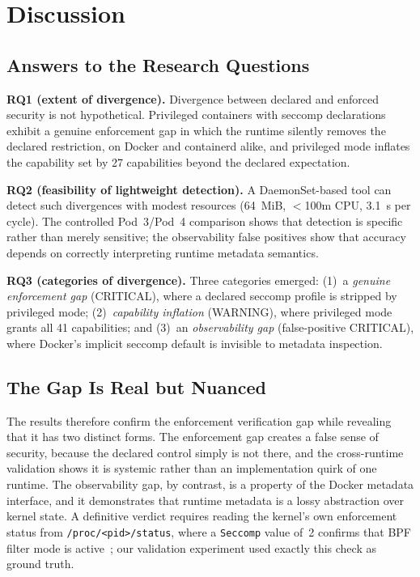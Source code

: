 \documentclass[sigconf]{acmart}
\begin{document}
\section{Discussion}

\subsection{Answers to the Research Questions}

\textbf{RQ1 (extent of divergence).} Divergence between declared and enforced security is not hypothetical. Privileged containers with seccomp declarations exhibit a genuine enforcement gap in which the runtime silently removes the declared restriction, on Docker and containerd alike, and privileged mode inflates the capability set by 27 capabilities beyond the declared expectation.

\textbf{RQ2 (feasibility of lightweight detection).} A DaemonSet-based tool can detect such divergences with modest resources (64~MiB, $<$100m CPU, 3.1~s per cycle). The controlled Pod~3/Pod~4 comparison shows that detection is specific rather than merely sensitive; the observability false positives show that accuracy depends on correctly interpreting runtime metadata semantics.

\textbf{RQ3 (categories of divergence).} Three categories emerged: (1)~a \emph{genuine enforcement gap} (CRITICAL), where a declared seccomp profile is stripped by privileged mode; (2)~\emph{capability inflation} (WARNING), where privileged mode grants all 41 capabilities; and (3)~an \emph{observability gap} (false-positive CRITICAL), where Docker's implicit seccomp default is invisible to metadata inspection.

\subsection{The Gap Is Real but Nuanced}

The results therefore confirm the enforcement verification gap while revealing that it has two distinct forms. The enforcement gap creates a false sense of security, because the declared control simply is not there, and the cross-runtime validation shows it is systemic rather than an implementation quirk of one runtime. The observability gap, by contrast, is a property of the Docker metadata interface, and it demonstrates that runtime metadata is a lossy abstraction over kernel state. A definitive verdict requires reading the kernel's own enforcement status from \texttt{/proc/<pid>/status}, where a \texttt{Seccomp} value of~2 confirms that BPF filter mode is active~\cite{kep2413}; our validation experiment used exactly this check as ground truth.
\end{document}
